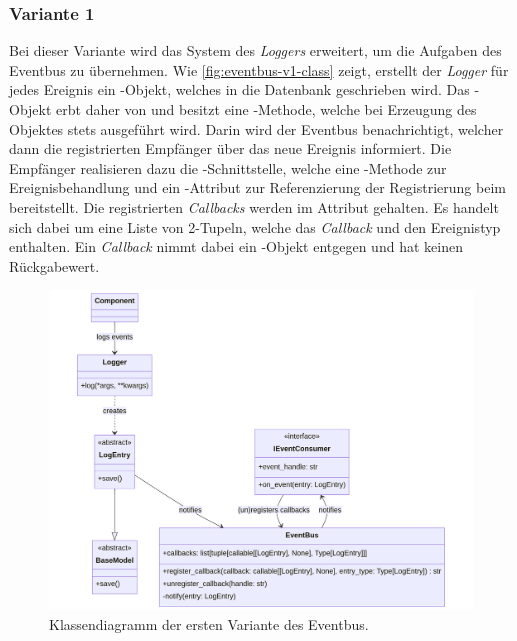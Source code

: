 \subsubsection*{Variante 1}

Bei dieser Variante wird das System des \emph{Loggers} erweitert, um die Aufgaben des Eventbus zu übernehmen. Wie \autoref{fig:eventbus-v1-class} zeigt, erstellt der \emph{Logger} für jedes Ereignis ein -Objekt, welches in die Datenbank geschrieben wird. Das -Objekt erbt daher von  und besitzt eine -Methode, welche bei Erzeugung des Objektes stets ausgeführt wird. Darin wird der Eventbus benachrichtigt, welcher dann die registrierten Empfänger über das neue Ereignis informiert. Die Empfänger realisieren dazu die -Schnittstelle, welche eine -Methode zur Ereignisbehandlung und ein -Attribut zur Referenzierung der Registrierung beim  bereitstellt. Die registrierten \emph{Callbacks} werden im Attribut  gehalten. Es handelt sich dabei um eine Liste von 2-Tupeln, welche das \emph{Callback} und den Ereignistyp enthalten. Ein \emph{Callback} nimmt dabei ein -Objekt entgegen und hat keinen Rückgabewert.

\begin{figure}[!ht]
	\centering
	\includegraphics[width=1.0\linewidth]{images/diagrams/eventbus-v1-class.png}
	\caption{Klassendiagramm der ersten Variante des Eventbus.}
	\label{fig:eventbus-v1-class}
\end{figure}

